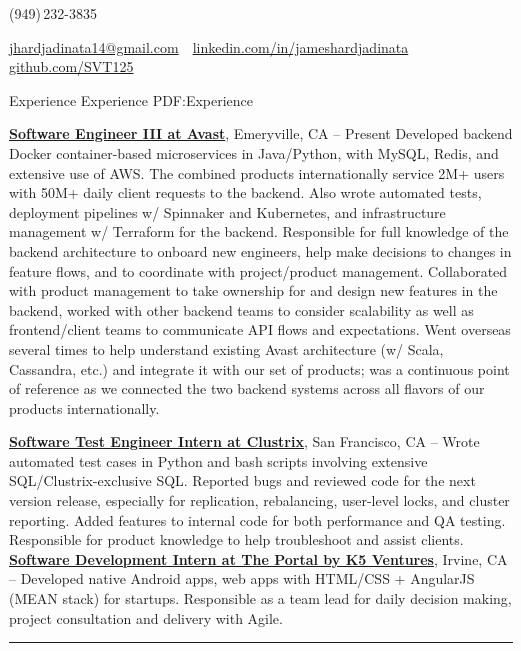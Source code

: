 \documentclass[letterpaper,MMMyyyy,nonstopmode]{simpleresumecv}
\makeatletter
\newcommand{\ResumeAuthor}{James Hardjadinata}
\newcommand{\ResumeWebsite}{github.com/SVT125}
\newcommand{\ResumeLinkedin}{linkedin.com/in/jameshardjadinata}
\newcommand{\ResumeEmail}{jhardjadinata14@gmail.com}
\makeatother
\begin{document}

\Title{\ResumeAuthor}
\begin{SubTitle}
	(949)\,232-3835
	\par
	\href{mailto:\ResumeEmail}
	{\ResumeEmail}
	\,\textbullet\,
	\href{\ResumeLinkedin}
	{\url{\ResumeLinkedin}}\,
	\,\textbullet\,
	\href{\ResumeWebsite}
	{\url{\ResumeWebsite}}
\end{SubTitle}

\begin{Body}


	\Section
	{Experience}
	{Experience}
	{PDF:Experience}

	\Entry
	\href{https://www.locationlabs.com/}
	{\textbf{Software Engineer III at Avast}},
	Emeryville, CA
	\hfill
	 --
	Present
	\Gap
	\BulletItem Developed backend Docker container-based microservices in Java/Python, with MySQL, Redis, and extensive use of AWS. The combined products internationally service 2M+ users with 50M+ daily client requests to the backend.
	\BulletItem Also wrote automated tests, deployment pipelines w/ Spinnaker and Kubernetes, and infrastructure management w/ Terraform for the backend.
	\BulletItem Responsible for full knowledge of the backend architecture to onboard new engineers, help make decisions to changes in feature flows, and to coordinate with project/product management.
	\BulletItem Collaborated with product management to take ownership for and design new features in the backend, worked with other backend teams to consider scalability as well as frontend/client teams to communicate API flows and expectations.
	\BulletItem Went overseas several times to help understand existing Avast architecture (w/ Scala, Cassandra, etc.) and integrate it with our set of products; was a continuous point of reference as we connected the two backend systems across all flavors of our products internationally.
	\newline

	\Entry
	\href{http://www.clustrix.com/}
	{\textbf{Software Test Engineer Intern at Clustrix}},
	San Francisco, CA
	\hfill
	 --
	\Gap
	\BulletItem Wrote automated test cases in Python and bash scripts involving extensive SQL/Clustrix-exclusive SQL.
	\BulletItem Reported bugs and reviewed code for the next version release, especially for replication, rebalancing, user-level locks, and cluster reporting.
	\BulletItem Added features to internal code for both performance and QA testing. 
	\BulletItem Responsible for product knowledge to help troubleshoot and assist clients.
	\newline
	\Entry
	\href{http://www.theportal.io/}
	{\textbf{Software Development Intern at The Portal by K5 Ventures}},
	Irvine, CA
	\hfill
	 --
	\Gap
	\BulletItem Developed native Android apps, web apps with HTML/CSS + AngularJS (MEAN stack) for startups.
	\BulletItem Responsible as a team lead for daily decision making, project consultation and delivery with Agile.\newline
	\hrule


\end{Body}
\end{document}
